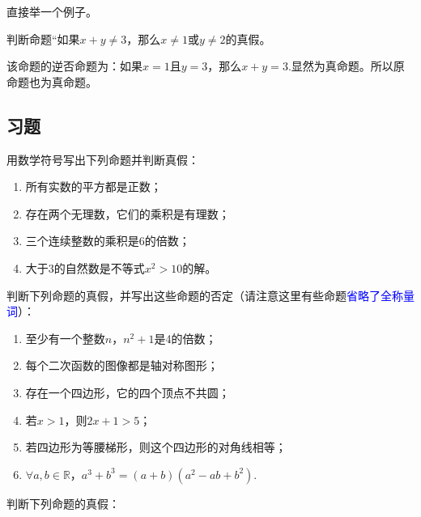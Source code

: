 \documentclass[lang=cn,math=cm,chinesefont=nofont,11pt,scheme=chinese,twocol]{elegantbook}
\begin{document}
直接举一个例子。

\begin{example}
  判断命题“如果$x+y\neq 3$，那么$x\neq 1$或$y\neq 2$的真假。
\end{example}

\begin{solution}
  该命题的逆否命题为：如果$x=1$且$y=3$，那么$x+y=3$.显然为真命题。所以原命题也为真命题。
\end{solution}

\subsection{习题}

\begin{exercise}
  用数学符号写出下列命题并判断真假：
\end{exercise}

\begin{enumerate}
  \item 所有实数的平方都是正数；
  \item 存在两个无理数，它们的乘积是有理数；
  \item 三个连续整数的乘积是6的倍数；
  \item 大于3的自然数是不等式$x^2>10$的解。
\end{enumerate}

\begin{exercise}
  判断下列命题的真假，并写出这些命题的否定（请注意这里有些命题\textcolor{blue}{省略了全称量词}）：
\end{exercise}

\begin{enumerate}
  \item 至少有一个整数$n$，$n^2+1$是4的倍数；
  \item 每个二次函数的图像都是轴对称图形；
  \item 存在一个四边形，它的四个顶点不共圆；
  \item 若$x>1$，则$2x+1>5$；
  \item 若四边形为等腰梯形，则这个四边形的对角线相等；
   \item $\forall a,b{\in}\mathbb{R}$，$a^3+b^3=(a+b)(a^2-ab+b^2)$.
\end{enumerate}

\begin{exercise}
  判断下列命题的真假：
\end{exercise}
\end{document}
